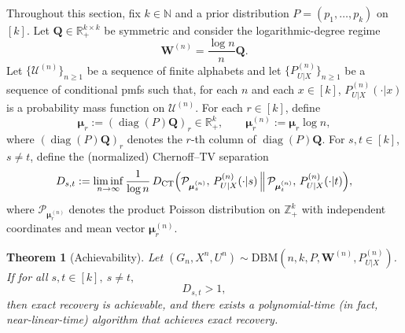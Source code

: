 \documentclass[11pt]{article}
\theoremstyle{plain}
\newtheorem{theorem}{Theorem}[section]
\theoremstyle{definition}
\DeclareMathOperator{\diag}{diag}
\begin{document}
Throughout this section, fix $k\in\mathbb{N}$ and a prior distribution $P=(p_1,\ldots,p_k)$ on $[k]$. 
Let $\mathbf{Q}\in\mathbb{R}_+^{k\times k}$ be symmetric and consider the logarithmic-degree regime
\[
\mathbf{W}^{(n)}=\frac{\log n}{n}\mathbf{Q}.
\]
Let $\{\mathcal{U}^{(n)}\}_{n\ge1}$ be a sequence of finite alphabets and let $\{P^{(n)}_{U|X}\}_{n\ge1}$ be a sequence of conditional pmfs such that,
for each $n$ and each $x\in[k]$, $P^{(n)}_{U|X}(\cdot|x)$ is a probability mass function on $\mathcal{U}^{(n)}$.
For each $r\in[k]$, define
\[
\boldsymbol{\mu}_r := (\diag(P)\mathbf{Q})_r \in \mathbb{R}_+^k,
\qquad 
\boldsymbol{\mu}_r^{(n)} := \boldsymbol{\mu}_r \log n,
\]
where $(\diag(P)\mathbf{Q})_r$ denotes the $r$-th column of $\diag(P)\mathbf{Q}$.
For $s,t\in[k]$, $s\neq t$, define the (normalized) Chernoff--TV separation
\begin{equation}
D_{s,t}
:= \liminf_{n\to\infty}\frac{1}{\log n}\,
D_{\mathrm{CT}}\Bigl(\mathcal{P}_{\boldsymbol{\mu}_s^{(n)}},\, P^{(n)}_{U|X}(\cdot|s)\,\Big\|\, 
\mathcal{P}_{\boldsymbol{\mu}_t^{(n)}},\, P^{(n)}_{U|X}(\cdot|t)\Bigr),
\label{eq:Dst_main}
\end{equation}
where $\mathcal{P}_{\boldsymbol{\mu}_r^{(n)}}$ denotes the product Poisson distribution on $\mathbb{Z}_+^k$ with independent coordinates and mean vector $\boldsymbol{\mu}_r^{(n)}$.

\begin{theorem}[Achievability]\label{thm:main_ach}
Let $(G_n,X^n,U^n)\sim \mathrm{DBM}\!\left(n,k,P,\mathbf{W}^{(n)},P^{(n)}_{U|X}\right)$.
If for all $s,t\in[k],\ s\neq t,$
\begin{equation}
D_{s,t}>1,
\label{eq:ach_condition}
\end{equation}
then exact recovery is achievable, and there exists a polynomial-time (in fact, near-linear-time) algorithm that achieves exact recovery.
\end{theorem}
\end{document}
